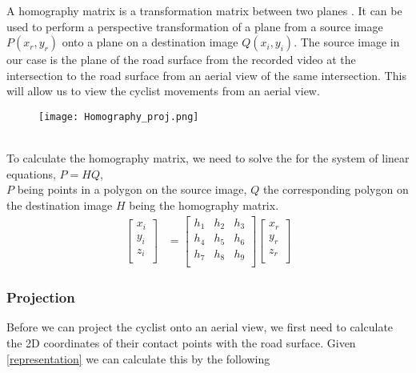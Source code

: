 A homography matrix is a transformation matrix between two planes \cite{hartley_zisserman_2004}. It can be used to perform a perspective transformation of a plane from a source image $P(x_r, y_r)$ onto a plane on a destination image $Q(x_i, y_i)$.
The source image in our case is the plane of the road surface from the recorded video at the intersection to the road surface from an aerial view of the same intersection.  
This will allow us to view the cyclist movements from an aerial view.
\ \\ 
\begin{figure}[h]
  \texttt{[image: Homography\_proj.png]}
  \centering 
  \end{figure}
  \label{homography}
\ \\ 
To calculate the homography matrix, we need to solve the for the system of linear equations, $P = HQ$,
\ \\
$P$ being points in a polygon on the source image, $Q$ the corresponding polygon on the destination image $H$ being the homography matrix.
\begin{align}
\label{eq:3}
  \begin{bmatrix}
    x_{i} \\
    y_{i} \\
    z_{i} \\
  \end{bmatrix}
  &= \begin{bmatrix}
      h_1 & h_2 & h_3 \\
      h_4 & h_5 & h_6 \\
      h_7 & h_8 & h_9 \\
  \end{bmatrix}
  \begin{bmatrix}
    x_{r} \\
    y_{r} \\
    z_{r} \\
  \end{bmatrix}
\end{align}

\subsubsection{Projection}

Before we can project the cyclist onto an aerial view, we first need to calculate the 2D coordinates of their contact points with the road surface.
Given \ref{representation} we can calculate this by the following

